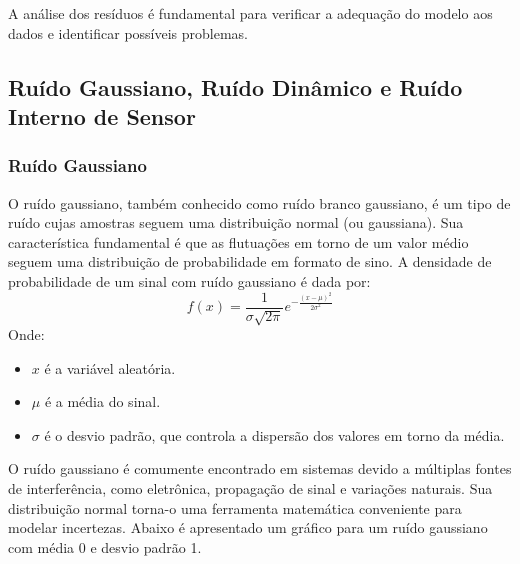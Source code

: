\documentclass[a4paper,12pt]{article}
\begin{document}
A análise dos resíduos é fundamental para verificar a adequação do modelo aos dados e identificar possíveis problemas.

\subsection{Ruído Gaussiano, Ruído Dinâmico e Ruído Interno de Sensor}

\subsubsection{Ruído Gaussiano}

O ruído gaussiano, também conhecido como ruído branco gaussiano, é um tipo de ruído cujas amostras seguem uma distribuição normal (ou gaussiana). Sua característica fundamental é que as flutuações em torno de um valor médio seguem uma distribuição de probabilidade em formato de sino. A densidade de probabilidade de um sinal com ruído gaussiano é dada por:
\begin{equation}
    f(x) = \frac{1}{\sigma \sqrt{2\pi}} e^{-\frac{(x - \mu)^2}{2\sigma^2}}\tag{2.9.1.1}
\end{equation}
Onde:
\begin{itemize}
    \item \(x\) é a variável aleatória.
    \item \(\mu\) é a média do sinal.
    \item \(\sigma\) é o desvio padrão, que controla a dispersão dos valores em torno da média.
\end{itemize}
O ruído gaussiano é comumente encontrado em sistemas devido a múltiplas fontes de interferência, como eletrônica, propagação de sinal e variações naturais. Sua distribuição normal torna-o uma ferramenta matemática conveniente para modelar incertezas. Abaixo é apresentado um gráfico para um ruído gaussiano com média 0 e desvio padrão 1.
\begin{center}
\end{center}
\end{document}
